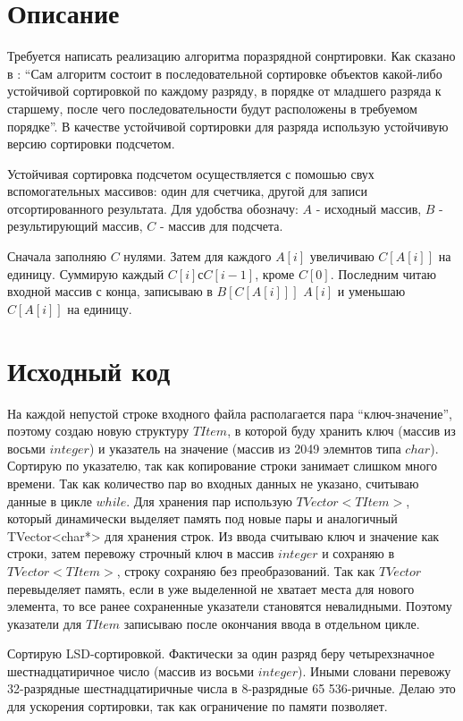 \section{Описание}
Требуется написать реализацию алгоритма поразрядной сонртировки. 
Как сказано в \cite{Kormen}: \enquote{Сам алгоритм состоит в последовательной сортировке объектов какой-либо устойчивой сортировкой по каждому разряду, в порядке от младшего разряда к старшему, после чего последовательности будут расположены в требуемом порядке}. В качестве устойчивой сортировки для разряда использую устойчивую версию сортировки подсчетом\cite{wikipedia_sort}. 

Устойчивая сортировка подсчетом осуществляется с помошью свух вспомогательных массивов: один для счетчика, другой для записи отсортированного результата. Для удобства обозначу: $A$ - исходный массив, $B$ - результирующий массив, $C$ - массив для подсчета. 

Сначала заполняю $C$ нулями. Затем для каждого $A[i]$ увеличиваю $C[A[i]]$ на единицу. Суммирую каждый $C[i] с C[i - 1]$, кроме $C[0]$. Последним читаю входной массив с конца, записываю в $B[C[A[i]]]$ $A[i]$ и уменьшаю $C[A[i]]$ на единицу\cite{wikipedia_sort}.

\pagebreak

\section{Исходный код}
На каждой непустой строке входного файла располагается пара \enquote{ключ-значение}, поэтому создаю новую 
структуру $TItem$, в которой буду хранить ключ (массив из восьми $integer$) и указатель на значение (массив из 2049 элемнтов типа $char$).  Сортирую по указателю, так как копирование строки занимает слишком много времени. Так как количество пар во входных данных не указано, считываю данные в цикле $while$. Для хранения пар использую $TVector<TItem>$, который динамически выделяет память под новые пары и аналогичный TVector<char*> для хранения строк. Из ввода считываю ключ и значение как строки, затем перевожу строчный ключ в массив $integer$ и сохраняю в $TVector<TItem>$, строку сохраняю без преобразований. Так как $TVector$ перевыделяет память, если в уже выделенной не хватает места для нового элемента, то все ранее сохраненные указатели становятся невалидными. Поэтому указатели для  $TItem$ записываю после окончания ввода в отдельном цикле.

Сортирую LSD-сортировкой. Фактически за один разряд беру четырехзначное шестнадцатиричное число (массив из восьми $integer$). Иными словани перевожу 32-разрядные шестнадцатиричные числа в 8-разрядные 65 536-ричные. Делаю это для ускорения сортировки, так как ограничение по памяти позволяет. 


